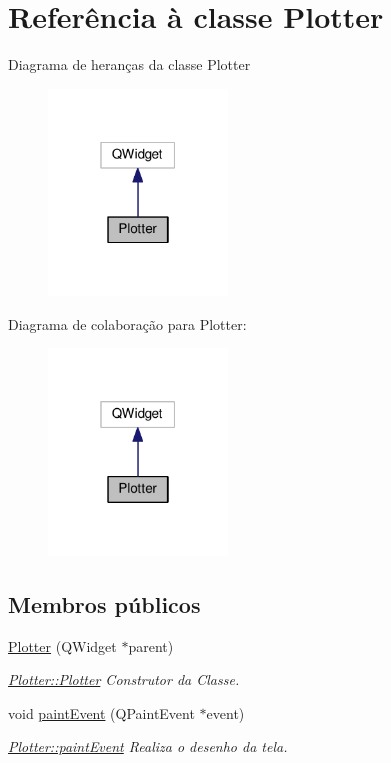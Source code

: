 \hypertarget{class_plotter}{}\section{Referência à classe Plotter}
\label{class_plotter}


Diagrama de heranças da classe Plotter\nopagebreak
\begin{figure}[H]
\begin{center}
\leavevmode
\includegraphics[width=135pt]{class_plotter__inherit__graph}
\end{center}
\end{figure}


Diagrama de colaboração para Plotter\+:\nopagebreak
\begin{figure}[H]
\begin{center}
\leavevmode
\includegraphics[width=135pt]{class_plotter__coll__graph}
\end{center}
\end{figure}
\subsection*{Membros públicos}
\begin{DoxyCompactItemize}
\item 
\hyperlink{class_plotter_a9d8f6981cf177bc3e843465d2b3425e9}{Plotter} (Q\+Widget $\ast$parent)
\begin{DoxyCompactList}\small\item\em \hyperlink{class_plotter_a9d8f6981cf177bc3e843465d2b3425e9}{Plotter\+::\+Plotter} Construtor da Classe. \end{DoxyCompactList}\item 
void \hyperlink{class_plotter_a06477bf987646f000a8982db1352a11d}{paint\+Event} (Q\+Paint\+Event $\ast$event)
\begin{DoxyCompactList}\small\item\em \hyperlink{class_plotter_a06477bf987646f000a8982db1352a11d}{Plotter\+::paint\+Event} Realiza o desenho da tela. \end{DoxyCompactList}\end{DoxyCompactItemize}


